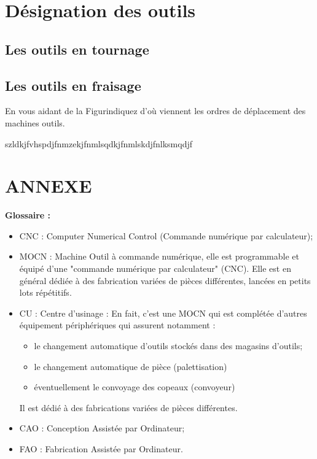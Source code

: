 \documentclass[12pt]{article}
\newcounter{exo}
\newenvironment{exo}{\stepcounter{exo}\vspace{0.5cm}{\bfseries Question \theexo\ :}}{\par\vspace{0.5cm}}
\begin{document}
\section{Désignation des outils}
\subsection{Les outils en tournage}
\subsection{Les outils en fraisage}


\begin{exo}\label{exo1} En vous aidant de la Figurindiquez d'où viennent les ordres de déplacement des machines outils.\end{exo}


\begin{tcolorbox}[colback=blue!5!white,colframe=red!75!black]
  \bcinfo szldkjfvhspdjfnmzekjfnmlsqdkjfnmlskdjfnlksmqdjf
\end{tcolorbox}


\section{ANNEXE}
\begin{tcolorbox}[colback=blue!5!white,colframe=orange!75!black]
\begin{center}
    \textbf{Glossaire :}
\end{center}
\begin{itemize}
    \item CNC : Computer Numerical Control (Commande numérique par calculateur);
    \item MOCN : Machine Outil à commande numérique, elle est programmable et équipé d'une "commande numérique par calculateur" (CNC). Elle est en général dédiée à des fabrication variées de pièces différentes, lancées en petits lots répétitifs.
    \item CU : Centre d'usinage : En fait, c'est une MOCN qui est complétée d'autres équipement périphériques qui assurent notamment : \begin{itemize}
        \item le changement automatique d'outils stockés dans des magasins d'outils;
        \item le changement automatique de pièce (palettisation)
        \item éventuellement le convoyage des copeaux (convoyeur)
    \end{itemize}
    Il est dédié à des fabrications variées de pièces différentes.
    \item CAO : Conception Assistée par Ordinateur;
    \item FAO : Fabrication Assistée par Ordinateur.
\end{itemize}
\end{tcolorbox}
\end{document}
